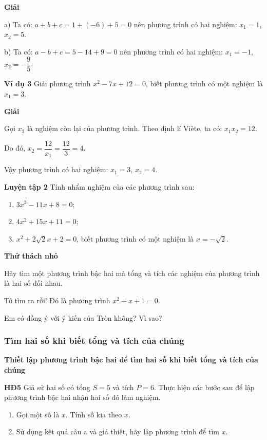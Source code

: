 \begin{lesson}
    \textbf{Giải}

    a) Ta có: $a+b+c=1+(-6)+5=0$ nên phương trình có hai nghiệm: $x_1=1$, $x_2=5$.

    b) Ta có: $a-b+c=5-14+9=0$ nên phương trình có hai nghiệm: $x_1=-1$, $x_2=-\dfrac{9}{5}$.

    \textbf{Ví dụ 3} Giải phương trình $x^2-7x+12=0$, biết phương trình có một nghiệm là $x_1=3$.

    \textbf{Giải}

    Gọi $x_2$ là nghiệm còn lại của phương trình. Theo định lí Viète, ta có: $x_1x_2=12$.

    Do đó, $x_2=\dfrac{12}{x_1}=\dfrac{12}{3}=4$.

    Vậy phương trình có hai nghiệm: $x_1=3$, $x_2=4$.

    \textbf{Luyện tập 2} Tính nhẩm nghiệm của các phương trình sau:
    \begin{enumerate}[label=\alph*)]
        \item $3x^2-11x+8=0$;
        \item $4x^2+15x+11=0$;
        \item $x^2+2\sqrt{2}x+2=0$, biết phương trình có một nghiệm là $x=-\sqrt{2}$.
    \end{enumerate}

    \answerline
    \answerline
    \answerline

    \textbf{Thử thách nhỏ}

    Hãy tìm một phương trình bậc hai mà tổng và tích các nghiệm của phương trình là hai số đối nhau.

    Tớ tìm ra rồi! Đó là phương trình $x^2+x+1=0$.


    Em có đồng ý với ý kiến của Tròn không? Vì sao?

    \answerline
    \answerline

    \subsubsection{Tìm hai số khi biết tổng và tích của chúng}

    \textbf{Thiết lập phương trình bậc hai để tìm hai số khi biết tổng và tích của chúng}

    \textbf{HĐ5} Giả sử hai số có tổng $S=5$ và tích $P=6$. Thực hiện các bước sau để lập phương trình bậc hai nhận hai số đó làm nghiệm.
    \begin{enumerate}[label=\alph*)]
        \item Gọi một số là $x$. Tính số kia theo $x$.
        \item Sử dụng kết quả câu a và giả thiết, hãy lập phương trình để tìm $x$.
    \end{enumerate}


\end{lesson}
